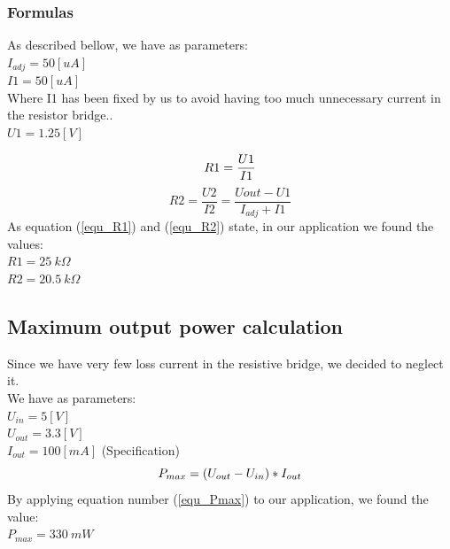 {\clearpage

\subsubsection{Formulas}
{
As described bellow, we have as parameters:\\
$ I_{adj} = 50 [uA] $ \\
$ I1 = 50 [uA] $ \\
Where I1 has been fixed by us to avoid having too much unnecessary current in the resistor bridge..\\
$ U1 = 1.25 [V] $ 

\begin{equation} \label{equ_R1}
     R1 = \frac{U1}{I1} \\
\end{equation} 
\begin{equation} \label{equ_R2}
     R2 = \frac{U2}{I2} = \frac{Uout - U1}{I_{adj}+I1} 
\end{equation}  
As equation (\ref{equ_R1}) and (\ref{equ_R2}) state, in our application we found the values: 
\\ {$ R1 = 25 \ k\Omega $ \\ $ R2 = 20.5 \ k\Omega $}
}

}

\subsection{Maximum output power calculation} \label{ssec:num02}
{
Since we have very few loss current in the resistive bridge, we decided to neglect it. \\
We have as parameters: \\
$ U_{in} = 5 [V] $ \\
$ U_{out} = 3.3 [V] $ \\
$ I_{out} = 100 [mA] $ (Specification) \\
\begin{equation} \label{equ_Pmax}
     P_{max} = (U_{out}-U_{in})*I_{out} \\
\end{equation} 
By applying equation number (\ref{equ_Pmax}) to our application, we found the value: \\ 
{$ P_{max} = 330 \ mW $}

}

